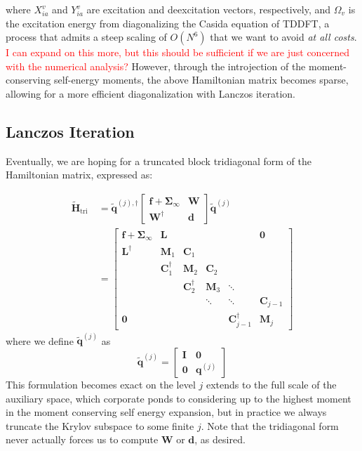\documentclass[12pt]{article} %
\newcommand{\red}[1]{\textcolor{red}{#1}}
\begin{document}
where $X_{ia}^v$ and $Y_{ia}^v$ are excitation and deexcitation vectors, respectively, and $\Omega _v$ is the excitation energy from diagonalizing the Casida equation of TDDFT, a process that admits a steep scaling of $O(N^6)$ that we want to avoid \emph{at all costs}. \red{I can expand on this more, but this should be sufficient if we are just concerned with the numerical analysis?} However, through the introjection of the moment-conserving self-energy moments, the above Hamiltonian matrix becomes sparse, allowing for a more efficient diagonalization with Lanczos iteration.
\subsection{Lanczos Iteration}
Eventually, we are hoping for a truncated block tridiagonal form of the Hamiltonian matrix, expressed as:


\begin{align}
\tilde{\mathbf{H}}_{\text {tri }} & =\tilde{\mathbf{q}}^{(j),\dagger}\left[\begin{array}{cc}
\mathbf{f}+\boldsymbol{\Sigma}_{\infty} & \mathbf{W} \\
\mathbf{W}^{\dagger} & \mathbf{d}
\end{array}\right] \tilde{\mathbf{q}}^{(j)} \\
& =\left[\begin{array}{cccccc}
\mathbf{f}+\mathbf{\Sigma}_{\infty} & \mathbf{L} & & & & \mathbf{0} \\
\mathbf{L}^{\dagger} & \mathbf{M}_{1} & \mathbf{C}_{1} & & & \\
& \mathbf{C}_{1}^{\dagger} & \mathbf{M}_{2} & \mathbf{C}_{2} & & \\
& & \mathbf{C}_{2}^{\dagger} & \mathbf{M}_{3} & \ddots & \\
& & & \ddots & \ddots & \mathbf{C}_{j-1} \\
\mathbf{0} & & & & \mathbf{C}_{j-1}^{\dagger} & \mathbf{M}_{j}
\end{array}\right]
\label{eq:tridiagonal}
\end{align}
where we define $\tilde{\mathbf{q}}^{(j)}$ as
\begin{equation}
    \tilde{\mathbf{q}}^{(j)}=\left[\begin{array}{cc}
\mathbf{I} & \mathbf{0} \\
\mathbf{0} & \mathbf{q}^{(j)}
\end{array}\right]
\end{equation}
This formulation becomes exact on the level $j$ extends to the full scale of the auxiliary space, which corporate ponds to considering up to the highest moment in the moment conserving self energy expansion, but in practice we always truncate the Krylov subspace to some finite $j$. Note that the tridiagonal form never actually forces us to compute $\mathbf{W}$ or $\mathbf{d}$, as desired.
\end{document}
